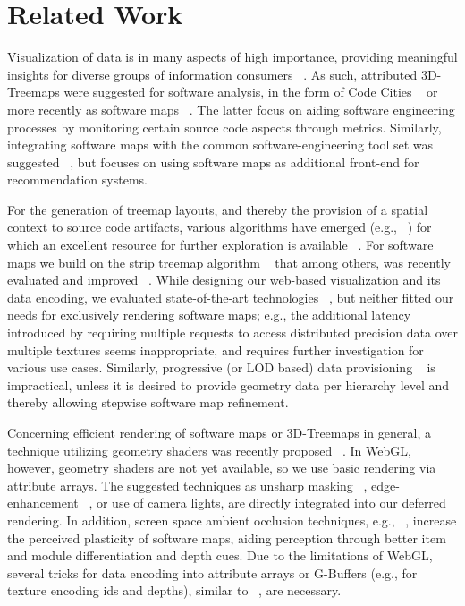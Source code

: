 \documentclass[annual]{acmsiggraph}
\newcommand{\scite}[1]{~\cite{#1}}
\begin{document}
\section{Related Work}

Visualization of data is in many aspects of high importance, providing meaningful insights for diverse groups of information consumers \scite{Langelier2005,Burger2007}.
As such, attributed 3D-Treemaps were suggested for software analysis, in the form of Code Cities \scite{Wettel2007a} or more recently as software maps \scite{Bohnet2011}.
The latter focus on aiding software engineering processes by monitoring certain source code aspects through metrics.
Similarly, integrating software maps with the common software-engineering tool set was suggested \scite{Truemper2012}, but focuses on using software maps as additional front-end for recommendation systems.

For the generation of treemap layouts, and thereby the provision of a spatial context to source code artifacts, various algorithms have emerged (e.g., \scite{Johnson1991}) for which an excellent resource for further exploration is available \scite{Schulz2011}.
For software maps we build on the strip treemap algorithm \scite{Bederson2002} that among others, was recently evaluated and improved \scite{Tak2012}.
While designing our web-based visualization and its data encoding, we evaluated state-of-the-art technologies \scite{Behr2010,Behr2012}, but neither fitted our needs for exclusively rendering software maps;
e.g., the additional latency introduced by requiring multiple requests to access distributed precision data over multiple textures seems inappropriate, and requires further investigation for various use cases.
Similarly, progressive (or LOD based) data provisioning \scite{Alliez2001} is impractical, unless it is desired to provide geometry data per hierarchy level and thereby allowing stepwise software map refinement.

Concerning efficient rendering of software maps or 3D-Treemaps in general, a technique utilizing geometry shaders was recently proposed \scite{Trapp2013}.
In WebGL, however, geometry shaders are not yet available, so we use basic rendering via attribute arrays. 
The suggested techniques as unsharp masking \scite{Luft2006}, edge-enhancement \scite{Nienhaus2003}, or use of camera lights, are directly integrated into our deferred rendering.
In addition, screen space ambient occlusion techniques, e.g., \scite{McGuire2010}, increase the perceived plasticity of software maps, aiding perception through better item and module differentiation and depth cues. 
Due to the limitations of WebGL, several tricks for data encoding into attribute arrays or G-Buffers (e.g., for texture encoding ids and depths), similar to \scite{Jung2013}, are necessary.
\end{document}
